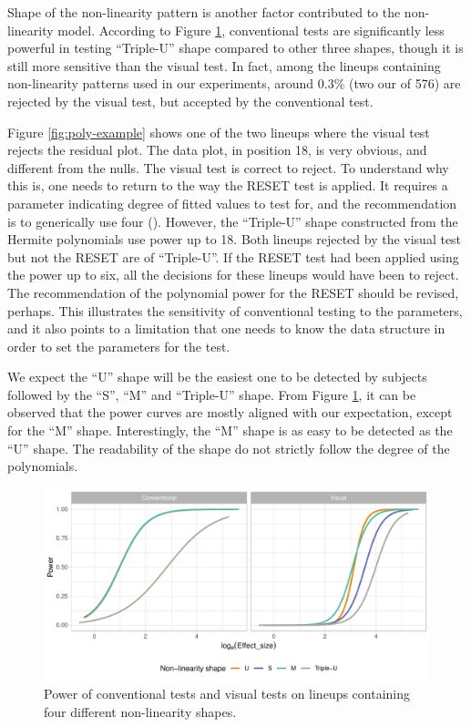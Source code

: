 \documentclass[]{interact}
\theoremstyle{plain}%
\theoremstyle{definition}
\theoremstyle{remark}
\begin{document}
Shape of the non-linearity pattern is another factor contributed to the
non-linearity model. According to Figure \ref{fig:poly-power-j},
conventional tests are significantly less powerful in testing
``Triple-U'' shape compared to other three shapes, though it is still
more sensitive than the visual test. In fact, among the lineups
containing non-linearity patterns used in our experiments, around 0.3\%
(two our of 576) are rejected by the visual test, but accepted by the
conventional test.

Figure \ref{fig:poly-example} shows one of the two lineups where the
visual test rejects the residual plot. The data plot, in position 18, is
very obvious, and different from the nulls. The visual test is correct
to reject. To understand why this is, one needs to return to the way the
RESET test is applied. It requires a parameter indicating degree of
fitted values to test for, and the recommendation is to generically use
four (\citet{ramsey_tests_1969}). However, the ``Triple-U'' shape
constructed from the Hermite polynomials use power up to 18. Both
lineups rejected by the visual test but not the RESET are of
``Triple-U''. If the RESET test had been applied using the power up to
six, all the decisions for these lineups would have been to reject. The
recommendation of the polynomial power for the RESET should be revised,
perhaps. This illustrates the sensitivity of conventional testing to the
parameters, and it also points to a limitation that one needs to know
the data structure in order to set the parameters for the test.

We expect the ``U'' shape will be the easiest one to be detected by
subjects followed by the ``S'', ``M'' and ``Triple-U'' shape. From
Figure \ref{fig:poly-power-j}, it can be observed that the power curves
are mostly aligned with our expectation, except for the ``M'' shape.
Interestingly, the ``M'' shape is as easy to be detected as the ``U''
shape. The readability of the shape do not strictly follow the degree of
the polynomials.

\begin{figure}

{\centering \includegraphics[width=1\linewidth]{paper_comparison_files/figure-latex/poly-power-j-1} 

}

\caption{Power of conventional tests and visual tests on lineups containing four different non-linearity shapes. }\label{fig:poly-power-j}
\end{figure}
\end{document}
